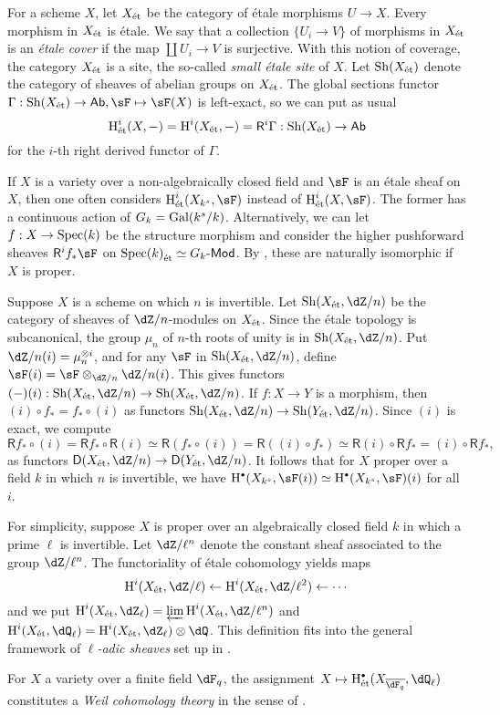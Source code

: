 \documentclass{article}
\begin{document}
For a scheme $X$, let ${X}_\textnormal{\'et}$ be the category of \'etale morphisms 
$U\to X$. Every morphism in ${X}_\textnormal{\'et}$ is \'etale. We say that a collection 
$\{U_i\to V\}$ of morphisms in ${X}_\textnormal{\'et}$ is an \emph{\'etale cover} if the 
map $\coprod U_i \to V$ is surjective. 
With this notion of coverage, the category ${X}_\textnormal{\'et}$ is a site, the so-called 
\emph{small \'etale site} of $X$. Let $\operatorname{Sh}({X}_\textnormal{\'et})$ denote the category of 
sheaves of abelian groups on ${X}_\textnormal{\'et}$. The global sections functor 
$\Gamma:\sheaf(\et X) \to \mathsf{Ab},\sF\mapsto \sF(X)$ is left-exact, so we 
can put as usual 
\[
  \operatorname{H}_\text{\'et}^i(X,-) = \operatorname{H}^i({X}_\textnormal{\'et},-) = \mathsf R^i \Gamma :\operatorname{Sh}({X}_\textnormal{\'et}) \to \mathsf{Ab}
\]
for the $i$-th right derived functor of $\Gamma$. 

If $X$ is a variety over a non-algebraically closed field and $\sF$ is an 
\'etale sheaf on $X$, then one often considers 
$\h_\text{\'et}^i(X_{k^s},\sF)$ instead of $\h_\text{\'et}^i(X,\sF)$. The 
former has a continuous action of $G_k=\operatorname{Gal}(k^s/k)$. Alternatively, we can 
let $f:X\to \operatorname{Spec}(k)$ be the structure morphism and consider the higher 
pushforward sheaves $\mathsf R^i f_\ast \sF$ on 
${\operatorname{Spec}(k)}_\textnormal{\'et}\simeq G_k\text{-}\mathsf{Mod}$. By \cite[I 4.1.1]{de77}, these 
are naturally isomorphic if $X$ is proper. 

Suppose $X$ is a scheme on which $n$ is invertible. Let $\sheaf(\et X,\dZ/n)$ 
be the category of sheaves of $\dZ/n$-modules on ${X}_\textnormal{\'et}$. Since the \'etale 
topology is subcanonical, the group $\mu_n$ of $n$-th roots of unity is in 
$\sheaf(\et X,\dZ/n)$. Put $\dZ/n(i) = \mu_n^{\otimes i}$, and for any $\sF$ in 
$\sheaf(\et X,\dZ/n)$, define $\sF(i) = \sF\otimes_{\dZ/n}\dZ/n(i)$. This gives 
functors $(-)(i):\sheaf(\et X,\dZ/n) \to \sheaf(\et X,\dZ/n)$. If $f:X\to Y$ is a 
morphism, then $(i)\circ f_\ast=f_\ast\circ (i)$ as functors 
$\sheaf(\et X,\dZ/n) \to \sheaf(\et Y,\dZ/n)$. Since $(i)$ is exact, we compute  
\[
  \mathsf R f_\ast \circ (i) = \mathsf R f_\ast \circ \mathsf R (i) \simeq \mathsf R(f_\ast \circ(i)) = \mathsf R((i)\circ f_\ast)\simeq  \mathsf R(i)\circ \mathsf R f_\ast = (i)\circ \mathsf R f_\ast \text{,}
\]
as functors $\mathsf D(\et X,\dZ/n) \to \mathsf D(\et Y,\dZ/n)$. It follows 
that for $X$ proper over a field $k$ in which $n$ is invertible, we have 
$\h^\bullet(X_{k^s},\sF(i)) \simeq \h^\bullet(X_{k^s},\sF)(i)$ for all $i$. 

For simplicity, suppose $X$ is proper over an algebraically closed field $k$ in 
which a prime $\ell$ is invertible. Let $\dZ/\ell^n$ denote the constant sheaf 
associated to the group $\dZ/\ell^n$. The functoriality of \'etale cohomology 
yields maps 
\[
  \h^i(\et X,\dZ/\ell) \leftarrow \h^i(\et X,\dZ/\ell^2) \leftarrow \cdots 
\]
and we put $\h^i(\et X,\dZ_\ell) = \varprojlim \h^i(\et X,\dZ/\ell^n)$ and 
$\h^i(\et X,\dQ_\ell) = \h^i(\et X,\dZ_\ell)\otimes \dQ$. This definition fits 
into the general framework of \emph{$\ell$-adic sheaves} set up in \cite{de80}. 

For $X$ a variety over a finite field $\dF_q$, the assignment  
$X\mapsto \h_\text{\'et}^\bullet(X_{\overline{\dF_q}},\dQ_\ell)$ constitutes a 
\emph{Weil cohomology theory} in the sense of \cite[3.3]{an04}. 












\end{document}
